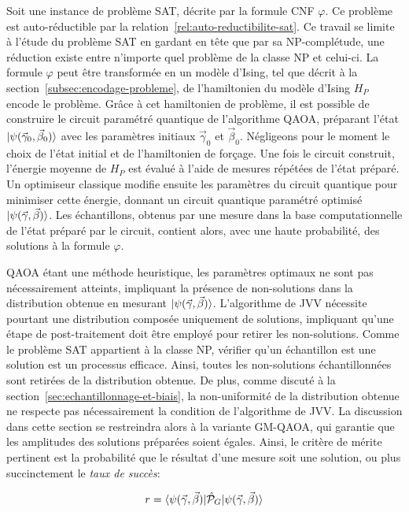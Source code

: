 Soit une instance de problème SAT, décrite par la formule CNF $\varphi$. Ce problème est auto-réductible par la relation~\ref{rel:auto-reductibilite-sat}. Ce travail se limite à l'étude du problème SAT en gardant en tête que par sa \textsf{NP}-complétude, une réduction existe entre n'importe quel problème de la classe \textsf{NP} et celui-ci. La formule $\varphi$ peut être transformée en un modèle d'Ising, tel que décrit à la section~\ref{subsec:encodage-probleme}, de l'hamiltonien du modèle d'Ising $H_{P}$ encode le problème. Grâce à cet hamiltonien de problème, il est possible de construire le circuit paramétré quantique de l'algorithme QAOA, préparant l'état $\ket{\psi(\vec{\gamma}_{0}, \vec{\beta}_{0})}$ avec les paramètres initiaux $\vec{\gamma}_0$ et $\vec{\beta}_{0}$. Négligeons pour le moment le choix de l'état initial et de l'hamiltonien de forçage. Une fois le circuit construit, l'énergie moyenne de $H_{P}$ est évalué à l'aide de mesures répétées de l'état préparé. Un optimiseur classique modifie ensuite les paramètres du circuit quantique pour minimiser cette énergie, donnant un circuit quantique paramétré optimisé $\ket{\psi(\vec{\gamma}, \vec{\beta})}$.
Les échantillons, obtenus par une mesure dans la base computationnelle de l'état préparé par le circuit, contient alors, avec une haute probabilité, des solutions à la formule $\varphi$.

QAOA étant une méthode heuristique, les paramètres optimaux ne sont pas nécessairement atteints, impliquant la présence de non-solutions dans la distribution obtenue en mesurant $\ket{\psi(\vec{\gamma}, \vec{\beta})}$. L'algorithme de JVV nécessite pourtant une distribution composée uniquement de solutions, impliquant qu'une étape de post-traitement doit être employé pour retirer les non-solutions. Comme le problème SAT appartient à la classe \textsf{NP}, vérifier qu'un échantillon est une solution est un processus efficace. Ainsi, toutes les non-solutions échantillonnées sont retirées de la distribution obtenue. De plus, comme discuté à la section~\ref{sec:echantillonnage-et-biais}, la non-uniformité de la distribution obtenue ne respecte pas nécessairement la condition de l'algorithme de JVV. La discussion dans cette section se restreindra alors à la variante GM-QAOA, qui garantie que les amplitudes des solutions préparées soient égales. Ainsi, le critère de mérite pertinent est la probabilité que le résultat d'une mesure soit une solution, ou plus succinctement le \textit{taux de succès}:

\begin{equation}
    r = \braket{ \psi(\vec{\gamma}, \vec{\beta}) | \hat{\mathcal{P}}_{G} | \psi(\vec{\gamma}, \vec{\beta}) }
\end{equation}

